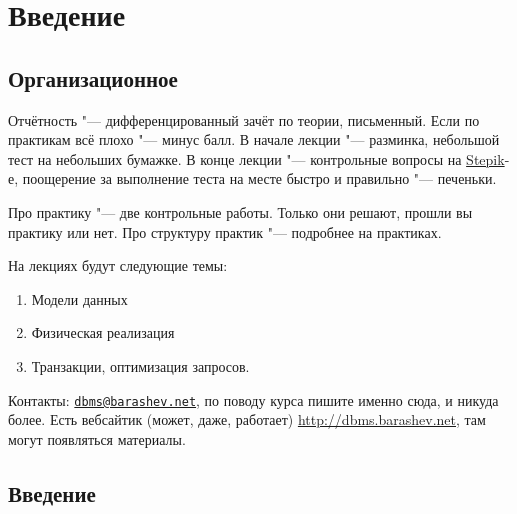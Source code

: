 \chapter{Введение}

\section{Организационное}

Отчётность "--- дифференцированный зачёт по теории, письменный.
Если по практикам всё плохо "--- минус балл.
В начале лекции "--- разминка, небольшой тест на небольших бумажке.
В конце лекции "--- контрольные вопросы на \href{http://goo.gl/ptnYrW}{Stepik}-е, поощерение за выполнение теста на месте быстро и правильно "--- печеньки.

Про практику "--- две контрольные работы.
Только они решают, прошли вы практику или нет.
Про структуру практик "--- подробнее на практиках.

На лекциях будут следующие темы:
\begin{enumerate}
	\item Модели данных
	\item Физическая реализация
	\item Транзакции, оптимизация запросов.
\end{enumerate}

Контакты: \href{mailto:dbms@barashev.net}{\texttt{dbms@barashev.net}}, по поводу курса пишите именно сюда, и никуда более.
Есть вебсайтик (может, даже, работает) \url{http://dbms.barashev.net}, там могут появляться материалы.

\section{Введение}

